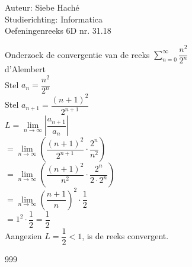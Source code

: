 \documentclass[a4paper]{article}
\begin{document}
\noindent \large Auteur: Siebe Haché \\
\noindent \large Studierichting: Informatica \\
\noindent \large Oefeningenreeks 6D nr. 31.18 \\

\medskip
\normalsize

Onderzoek de convergentie van de reeks $\displaystyle\sum_{n=0}^{\infty}\dfrac{n^2}{2^n}$ \\

d'Alembert\\

Stel $a_n = \dfrac{n^2}{2^n}$\\

Stel $a_{n+1} = \dfrac{(n+1)^2}{2^{n+1}}$\\

$L = \lim\limits_{n \to \infty} \left| \dfrac{a_{n+1}}{a_n} \right|$\\

$= \lim\limits_{n \to \infty} \left( \dfrac{(n+1)^2}{2^{n+1}} \cdot \dfrac{2^n}{n^2} \right)$ \\

$= \lim\limits_{n \to \infty} \left( \dfrac{(n+1)^2}{n^2} \cdot \dfrac{2^n}{2 \cdot 2^n} \right) $\\

$= \lim\limits_{n \to \infty} \left( \dfrac{n+1}{n} \right)^2 \cdot \dfrac{1}{2}$ \\

$= 1^2 \cdot \dfrac{1}{2} = \dfrac{1}{2}$\\

Aangezien $L = \dfrac{1}{2} < 1$, is de reeks convergent.\\

\begin{thebibliography}{999}
\end{thebibliography}
\end{document}
